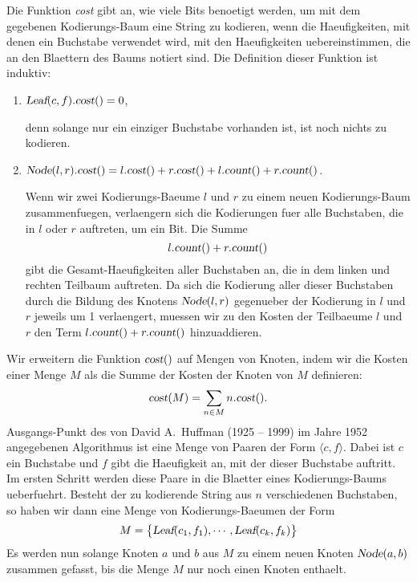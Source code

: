 Die Funktion \textsl{cost} gibt an, wie viele Bits benoetigt werden, um mit dem gegebenen
Kodierungs-Baum eine String zu kodieren, wenn die Haeufigkeiten, mit denen ein Buchstabe
verwendet wird, mit den Haeufigkeiten uebereinstimmen, die an den Blaettern des Baums notiert
sind.  Die Definition dieser Funktion ist induktiv:
\begin{enumerate}
\item $\textsl{Leaf}(c,f).\textsl{cost}() = 0$,

      denn solange nur ein einziger Buchstabe vorhanden ist, ist noch nichts zu kodieren.
\item $\textsl{Node}(l,r).\textsl{cost}() = 
       l.\textsl{cost}() + r.\textsl{cost}() + l.\textsl{count}() + r.\textsl{count}()$.

      Wenn wir zwei Kodierungs-Baeume $l$ und $r$ zu einem neuen Kodierungs-Baum
      zusammenfuegen, verlaengern sich die Kodierungen fuer alle Buchstaben, die in $l$ oder
      $r$ auftreten, um ein Bit.
      Die Summe 
      \[ l.\textsl{count}() + r.\textsl{count}() \]
      gibt die Gesamt-Haeufigkeiten aller Buchstaben an, die in dem linken und
      rechten Teilbaum auftreten.  Da sich die Kodierung aller dieser Buchstaben
      durch die Bildung des Knotens $\textsl{Node}(l,r)$ gegenueber der Kodierung in $l$
      und $r$ jeweils um 1 verlaengert, muessen wir zu den Kosten der Teilbaeume $l$ und $r$
      den Term $l.\textsl{count}() + r.\textsl{count}()$ hinzuaddieren.
\end{enumerate}
Wir erweitern die Funktion $\textsl{cost}()$ auf Mengen von Knoten, indem wir die Kosten
einer Menge $M$ als die Summe der Kosten der Knoten von $M$ definieren:
\[ \textsl{cost}(M) = \sum\limits_{n\in M} n.\textsl{cost}(). \]
Ausgangs-Punkt des von David A.~Huffman (1925 -- 1999) im Jahre 1952 angegebenen
Algorithmus \cite{huffman:52} ist eine Menge von Paaren der Form $\langle c, f\rangle$.  Dabei ist
$c$ ein 
Buchstabe und $f$ gibt die Haeufigkeit an, mit der dieser Buchstabe auftritt.  Im ersten
Schritt werden diese Paare in die Blaetter eines Kodierungs-Baums ueberfuehrt.  Besteht der
zu kodierende String aus  $n$ verschiedenen Buchstaben, so haben
wir dann eine Menge von Kodierungs-Baeumen der Form
\begin{equation}
  \label{eq:huffmann1}
 M = \bigl\{  \textsl{Leaf}(c_1, f_1), \cdots, \textsl{Leaf}(c_k, f_k) \bigr\}   
\end{equation}
Es werden nun solange Knoten $a$ und $b$ aus $M$ zu einem neuen Knoten
$\textsl{Node}(a,b)$ zusammen gefasst, bis die Menge $M$ nur noch einen Knoten enthaelt.
